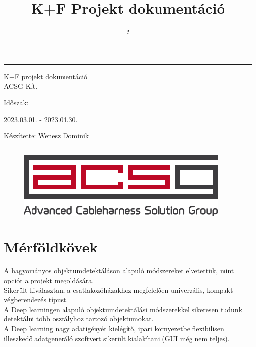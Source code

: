 \documentclass{article}
\title{K+F Projekt dokumentáció}
\author{}
\date{2}
\begin{document}

\begin{center}
    \hrule
    \vspace{0.5cm}
    \begin{Huge}
    K+F projekt dokumentáció\\
    ACSG Kft.\\
    \end{Huge}
    \vspace{0.5cm}
    \begin{huge}
    Időszak:\\
    \end{huge}
    \begin{Large}
    2023.03.01. - 2023.04.30.\\
    \end{Large} \vspace{10pt}
    \begin{large}
    Készítette: Wenesz Dominik\\
    \end{large}\vspace{0.5cm}
    \hrule
    
  \end{center}
  \begin{figure}[b]
    \centering
    \includegraphics[]{acsg.png}
\end{figure}
  


\thispagestyle{empty}
\setcounter{page}{0}




\newpage
\tableofcontents
\newpage

\section{Mérföldkövek}
A hagyományos objektumdetektáláson alapuló módszereket elvetettük, mint
opciót a projekt megoldására.\\[3pt]
Sikerült kiválasztani a csatlakozóházakhoz megfelelően univerzális,
kompakt végberendezés típust.\\[3pt]
A Deep learningen alapuló objektumdetektálási módszerekkel sikeresen 
tudunk detektálni több osztályhoz tartozó objektumokat.\\[3pt]
A Deep learning nagy adatigényét kielégítő, ipari környezetbe flexibilisen illeszkedő
adatgeneráló szoftvert sikerült kialakítani (GUI még nem teljes).
\end{document}
